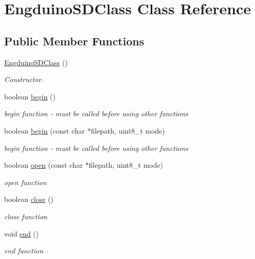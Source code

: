 \hypertarget{class_engduino_s_d_class}{}\section{Engduino\+S\+D\+Class Class Reference}
\label{class_engduino_s_d_class}
\subsection*{Public Member Functions}
\begin{DoxyCompactItemize}
\item 
\hyperlink{group___engduino_s_d_ga3f1f4d4ab1f7d9266d293ebd485ec02a}{Engduino\+S\+D\+Class} ()
\begin{DoxyCompactList}\small\item\em Constructor. \end{DoxyCompactList}\item 
boolean \hyperlink{group___engduino_s_d_ga5e6b57dac1ab9ba6de542adf0866d049}{begin} ()
\begin{DoxyCompactList}\small\item\em begin function -\/ must be called before using other functions \end{DoxyCompactList}\item 
boolean \hyperlink{group___engduino_s_d_ga2ef82f0b803d5f71436becb8f9a0e162}{begin} (const char $\ast$filepath, uint8\+\_\+t mode)
\begin{DoxyCompactList}\small\item\em begin function -\/ must be called before using other functions \end{DoxyCompactList}\item 
boolean \hyperlink{group___engduino_s_d_ga2a5732a0ca8a4d67eb8584377eff03aa}{open} (const char $\ast$filepath, uint8\+\_\+t mode)
\begin{DoxyCompactList}\small\item\em open function \end{DoxyCompactList}\item 
boolean \hyperlink{group___engduino_s_d_ga5955e04f63806f0ea11c9b754a62e8fc}{close} ()
\begin{DoxyCompactList}\small\item\em close function \end{DoxyCompactList}\item 
void \hyperlink{group___engduino_s_d_gac381fbc074cacbada62e9bfac3470e26}{end} ()
\begin{DoxyCompactList}\small\item\em end function \end{DoxyCompactList}\item 

\end{DoxyCompactItemize}
